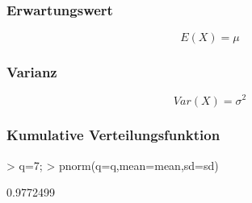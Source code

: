 \subsubsection{Erwartungswert}
\[ E(X) = \mu \]

\subsubsection{Varianz}
\[ Var(X) = \sigma^2 \]

\subsubsection{Kumulative Verteilungsfunktion}
\begin{Schunk}
\begin{Sinput}
> q=7;
> pnorm(q=q,mean=mean,sd=sd)
\end{Sinput}
\begin{Soutput}
[1] 0.9772499
\end{Soutput}
\end{Schunk}

